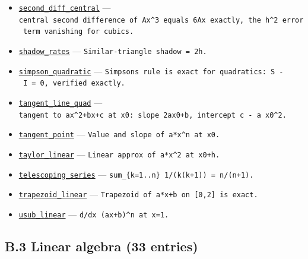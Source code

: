 \documentclass[
  10pt,
]{article}
\begin{document}
\begin{itemize}
  --- \texttt{Second\ derivative\ of\ a*x\^{}n\ at\ x0.}
\item
  \href{../generation_1/I3/algos_i3.py}{\texttt{second\_diff\_central}}
  ---
  \texttt{central\ second\ difference\ of\ Ax\^{}3\ equals\ 6Ax\ exactly,\ the\ h\^{}2\ error\ term\ vanishing\ for\ cubics.}
\item
  \href{../generation_1/I1/algos_gen1_big.py}{\texttt{shadow\_rates}}
  --- \texttt{Similar-triangle\ shadow\ =\ 2h.}
\item
  \href{../generation_1/I3/algos_i3.py}{\texttt{simpson\_quadratic}} ---
  \texttt{Simpson\textquotesingle{}s\ rule\ is\ exact\ for\ quadratics:\ S\ -\ I\ =\ 0,\ verified\ exactly.}
\item
  \href{../generation_1/I3/algos_i3.py}{\texttt{tangent\_line\_quad}}
  ---
  \texttt{tangent\ to\ ax\^{}2+bx+c\ at\ x0:\ slope\ 2ax0+b,\ intercept\ c\ -\ a\ x0\^{}2.}
\item
  \href{../generation_1/I1/algos_gen1_big.py}{\texttt{tangent\_point}}
  --- \texttt{Value\ and\ slope\ of\ a*x\^{}n\ at\ x0.}
\item
  \href{../generation_1/I1/algos_gen1_big.py}{\texttt{taylor\_linear}}
  --- \texttt{Linear\ approx\ of\ a*x\^{}2\ at\ x0+h.}
\item
  \href{../generation_1/I1/algos_gen1_ext.py}{\texttt{telescoping\_series}}
  --- \texttt{sum\_\{k=1..n\}\ 1/(k(k+1))\ =\ n/(n+1).}
\item
  \href{../generation_1/I1/algos_gen1_big.py}{\texttt{trapezoid\_linear}}
  --- \texttt{Trapezoid\ of\ a*x+b\ on\ {[}0,2{]}\ is\ exact.}
\item
  \href{../generation_1/I1/algos_gen1_big.py}{\texttt{usub\_linear}} ---
  \texttt{d/dx\ (ax+b)\^{}n\ at\ x=1.}
\end{itemize}

\subsection{B.3 Linear algebra (33
entries)}\label{b.3-linear-algebra-33-entries}
\end{document}
